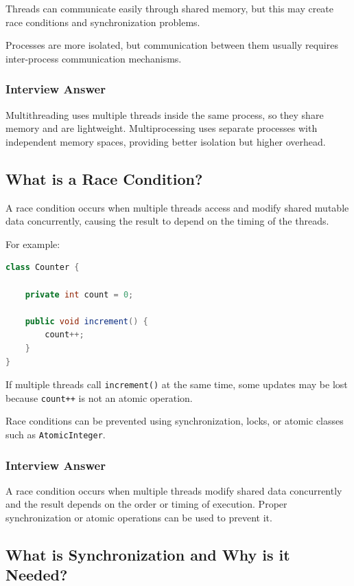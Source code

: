 \documentclass[12pt,a4paper]{article}
\begin{document}
Threads can communicate easily through shared memory, but this may create
race conditions and synchronization problems.

Processes are more isolated, but communication between them usually
requires inter-process communication mechanisms.

\subsubsection*{Interview Answer}

Multithreading uses multiple threads inside the same process, so they share
memory and are lightweight. Multiprocessing uses separate processes with
independent memory spaces, providing better isolation but higher overhead.

\subsection{What is a Race Condition?}

A race condition occurs when multiple threads access and modify shared
mutable data concurrently, causing the result to depend on the timing of
the threads.

For example:

\begin{lstlisting}[language=Java]
class Counter {

    private int count = 0;

    public void increment() {
        count++;
    }
}
\end{lstlisting}

If multiple threads call \texttt{increment()} at the same time, some
updates may be lost because \texttt{count++} is not an atomic operation.

Race conditions can be prevented using synchronization, locks, or atomic
classes such as \texttt{AtomicInteger}.

\subsubsection*{Interview Answer}

A race condition occurs when multiple threads modify shared data
concurrently and the result depends on the order or timing of execution.
Proper synchronization or atomic operations can be used to prevent it.

\subsection{What is Synchronization and Why is it Needed?}
\end{document}
